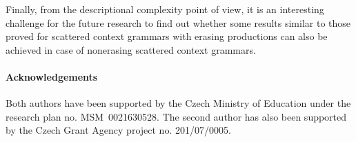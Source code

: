 \documentclass[copyright]{eptcs}
\begin{document}
  Finally, from the descriptional complexity point of view, it is an interesting challenge for the future research to find out whether some results similar to those proved for scattered context grammars with erasing productions can also be achieved in case of nonerasing scattered context grammars.


\paragraph{Acknowledgements}
  Both authors have been supported by the Czech Ministry of Education under the research plan no. MSM~0021630528. The second author has also been supported by the Czech Grant Agency project no. 201/07/0005.



\end{document}
